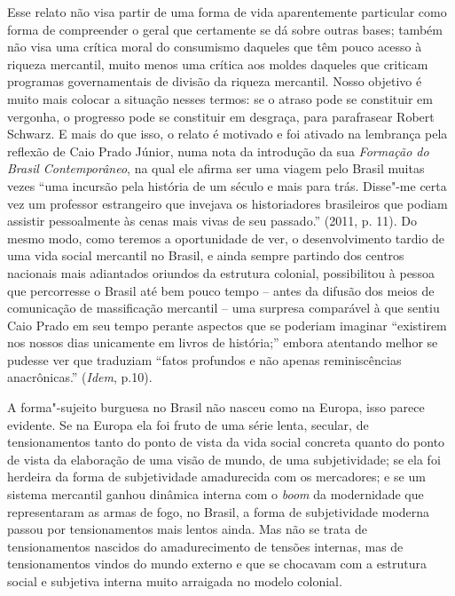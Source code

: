 Esse relato não visa partir de uma forma de vida aparentemente
particular como forma de compreender o geral que certamente se dá sobre
outras bases; também não visa uma crítica moral do consumismo daqueles
que têm pouco acesso à riqueza mercantil, muito menos uma crítica aos
moldes daqueles que criticam programas governamentais de divisão da
riqueza mercantil. Nosso objetivo é muito mais colocar a situação nesses
termos: se o atraso pode se constituir em vergonha, o progresso pode se
constituir em desgraça, para parafrasear Robert Schwarz. E mais do que
isso, o relato é motivado e foi ativado na lembrança pela reflexão de
Caio Prado Júnior, numa nota da introdução da sua \emph{Formação do
Brasil Contemporâneo}, na qual ele afirma ser uma viagem pelo Brasil
muitas vezes ``uma incursão pela história de um século e mais para trás.
Disse"-me certa vez um professor estrangeiro que invejava os
historiadores brasileiros que podiam assistir pessoalmente às cenas mais
vivas de seu passado.'' (2011, p. 11). Do mesmo modo, como teremos a
oportunidade de ver, o desenvolvimento tardio de uma vida social
mercantil no Brasil, e ainda sempre partindo dos centros nacionais mais
adiantados oriundos da estrutura colonial, possibilitou à pessoa que
percorresse o Brasil até bem pouco tempo -- antes da difusão dos meios
de comunicação de massificação mercantil -- uma surpresa comparável à
que sentiu Caio Prado em seu tempo perante aspectos que se poderiam
imaginar ``existirem nos nossos dias unicamente em livros de história;''
embora atentando melhor se pudesse ver que traduziam ``fatos profundos e
não apenas reminiscências anacrônicas.'' (\emph{Idem}, p.10).

A forma"-sujeito burguesa no Brasil não nasceu como na Europa, isso
parece evidente. Se na Europa ela foi fruto de uma série lenta, secular,
de tensionamentos tanto do ponto de vista da vida social concreta quanto
do ponto de vista da elaboração de uma visão de mundo, de uma
subjetividade; se ela foi herdeira da forma de subjetividade amadurecida
com os mercadores; e se um sistema mercantil ganhou dinâmica interna com
o \emph{boom} da modernidade que representaram as armas de fogo, no
Brasil, a forma de subjetividade moderna passou por tensionamentos mais
lentos ainda. Mas não se trata de tensionamentos nascidos do
amadurecimento de tensões internas, mas de tensionamentos vindos do
mundo externo e que se chocavam com a estrutura social e subjetiva
interna muito arraigada no modelo colonial.

